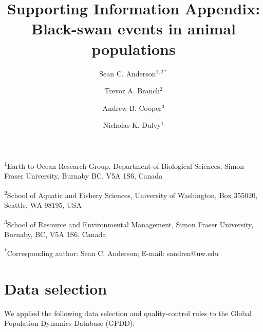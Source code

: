 \documentclass[12pt]{article}
\title{Supporting Information Appendix:\\
  Black-swan events in animal populations}
\author{
Sean C. Anderson$^{1,2*}$ \and
Trevor A. Branch$^2$ \and
Andrew B. Cooper$^3$ \and
Nicholas K. Dulvy$^1$
}
\date{}
\begin{document}


\maketitle

\textsuperscript{1}Earth to Ocean Research Group, Department of Biological
Sciences, Simon Fraser University, Burnaby BC, V5A 1S6, Canada

\textsuperscript{2}School of Aquatic and Fishery Sciences, University of
Washington, Box 355020, Seattle, WA 98195, USA

\textsuperscript{3}School of Resource and Environmental Management, Simon
Fraser University, Burnaby, BC, V5A 1S6, Canada

\textsuperscript{*}Corresponding author: Sean C. Anderson; E-mail: sandrsn@uw.edu

\onehalfspacing




\section{Data selection}

We applied the following data selection and quality-control rules to the
Global Population Dynamics Database (GPDD):
\end{document}
